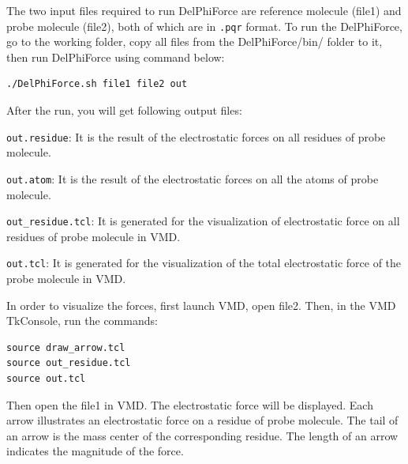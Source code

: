 \documentclass[9pt,tutorial]{livecoms}
\begin{document}
The two input files required to run DelPhiForce are reference molecule (file1) and probe molecule (file2), both of which are in \texttt{.pqr} format. To run the DelPhiForce, go to the working folder, copy all files from the DelPhiForce/bin/ folder to it, then run DelPhiForce using command below:

\begin{verbatim}
./DelPhiForce.sh file1 file2 out
\end{verbatim}

After the run, you will get following output files:

\texttt{out.residue}: It is the result of the electrostatic forces on all residues of probe molecule.

\texttt{out.atom}: It is the result of the electrostatic forces on all the atoms of probe molecule.

\texttt{out\_residue.tcl}: It is generated for the visualization of electrostatic force on all residues of probe molecule in VMD\cite{humphrey1996vmd}.

\texttt{out.tcl}: It is generated for the visualization of the total electrostatic force of the probe molecule in VMD\cite{humphrey1996vmd}.

In order to visualize the forces, first launch VMD, open file2. Then, in the VMD TkConsole, run the commands: 

\begin{verbatim}
source draw_arrow.tcl
source out_residue.tcl
source out.tcl
\end{verbatim}

Then open the file1 in VMD. The electrostatic force will be displayed.  Each arrow illustrates an electrostatic force on a residue of probe molecule. The tail of an arrow is the mass center of the corresponding residue. The length of an arrow indicates the magnitude of the force.
\end{document}
